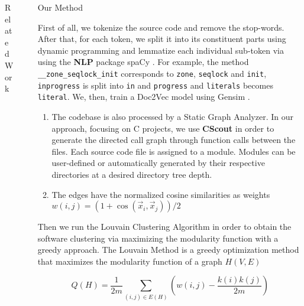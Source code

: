 \documentclass[final]{beamer}
\newlength{\sepwidth}
\newlength{\colwidth}
\newcommand{\separatorcolumn}{\begin{column}{\sepwidth}\end{column}}
\begin{document}
\begin{frame}[t]
\begin{columns}[t]
\begin{column}{\colwidth}
\begin{block}{Related Work}
\end{block}



\end{column}

\separatorcolumn

\begin{column}{\colwidth}

\begin{alertblock}{Our Method}

First of all, we tokenize the source code and remove the stop-words. 
After that, for each token, we split it into its constituent parts using dynamic programming \cite{wordninja} and lemmatize 
each individual sub-token via using the \textbf{NLP} package spaCy \cite{spacy}. 
For example, the method \texttt{\_\_zone\_seqlock\_init} corresponds to \texttt{zone}, \texttt{seqlock} and \texttt{init}, 
\texttt{inprogress} is split into \texttt{in} and \texttt{progress} and \texttt{literals} becomes \texttt{literal}.
We, then, train a Doc2Vec model using Gensim \cite{gensim}. 


\begin{enumerate}
\item The codebase is also processed by a Static Graph Analyzer. 
In our approach, focusing on C projects, we use \textbf{CScout} \cite{cscout} in order to generate the directed call graph through function calls between the files. 
Each source code file is assigned to a module. 
Modules can be user-defined or automatically generated by their respective directories at a desired directory tree depth. 

\item The edges have the normalized cosine similarities as weights $w(i,j) = (1 + \cos(\vec x_i, \vec x_j)) / 2$
\end{enumerate}




Then we run the Louvain Clustering Algorithm \cite{louvain} in
order to obtain the software clustering via maximizing the modularity function with a greedy approach. 
The Louvain Method is a greedy optimization method that maximizes the modularity function of a graph $H(V, E)$

$$Q(H) = \frac {1}{2m} \sum_{(i, j) \in E(H)} \left ( w(i, j) - \frac {k(i) k(j)} {2m} \right )$$
    

\end{alertblock}
\end{column}
\end{columns}
\end{frame}
\end{document}

